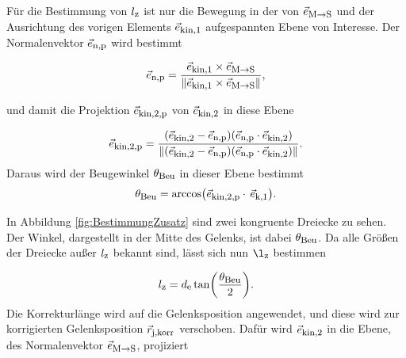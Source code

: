 Für die Bestimmung von $l_{\textrm{\footnotesize{z}}}$ ist nur die Bewegung in der von $\vec{e}_{\textrm{\footnotesize{M${\rightarrow}$S}}}$ und der Ausrichtung des vorigen Elements $\vec{e}_{\textrm{\footnotesize{kin,1}}}$ aufgespannten Ebene von Interesse. Der Normalenvektor $\vec{e}_{\textrm{\footnotesize{n,p}}}$ wird bestimmt

\begin{equation}
    \vec{e}_{\textrm{\footnotesize{n,p}}} = \frac{\vec{e}_{\textrm{\footnotesize{kin,1}}} \times \vec{e}_{\textrm{\footnotesize{M${\rightarrow}$S}}}}{\|\vec{e}_{\textrm{\footnotesize{kin,1}}} \times \vec{e}_{\textrm{\footnotesize{M${\rightarrow}$S}}}\|},
    \label{eq:korrProjection}
\end{equation}

und damit die Projektion $\vec{e}_{\textrm{\footnotesize{kin,2,p}}}$ von $\vec{e}_{\textrm{\footnotesize{kin,2}}}$ in diese Ebene

\begin{equation}
    \vec{e}_{\textrm{\footnotesize{kin,2,p}}} = \frac{ (\vec{e}_{\textrm{\footnotesize{kin,2}}} - \vec{e}_{\textrm{\footnotesize{n,p}}}) (\vec{e}_{\textrm{\footnotesize{n,p}}} \cdot \vec{e}_{\textrm{\footnotesize{kin,2}}})  }{\|(\vec{e}_{\textrm{\footnotesize{kin,2}}} - \vec{e}_{\textrm{\footnotesize{n,p}}}) (\vec{e}_{\textrm{\footnotesize{n,p}}} \cdot \vec{e}_{\textrm{\footnotesize{kin,2}}})\|}.
    \label{eq:korrVekProjetion}
\end{equation}
Daraus wird der Beugewinkel $\theta_{\textrm{\footnotesize{Beu}}}$ in dieser Ebene bestimmt
\begin{equation}
    \theta_{\textrm{\footnotesize{Beu}}} = \arccos\bigl(\vec{e}_{\textrm{\footnotesize{kin,2,p}}} \cdot\, \vec{e}_{\textrm{\footnotesize{k,1}}}\bigr).
\end{equation}

In Abbildung \ref{fig:BestimmungZusatz} sind zwei kongruente Dreiecke zu sehen. Der Winkel, dargestellt in der Mitte des Gelenks, ist dabei $\theta_{\textrm{\footnotesize{Beu}}}$. Da alle Größen der Dreiecke außer $l_{\textrm{\footnotesize{z}}}$ bekannt sind, lässt sich nun $\l\tindex{z}$ bestimmen

\begin{equation}
    l_{\textrm{\footnotesize{z}}} = d_{\textrm{\footnotesize{e}}} \tan\biggl({\frac{\theta_{\textrm{\footnotesize{Beu}}}}{2}}\biggr).
    \label{eq:Bestimmunglz}
\end{equation}
Die Korrekturlänge wird auf die Gelenksposition angewendet, und diese wird zur korrigierten Gelenksposition $\vec{r}_{\textrm{\footnotesize{j,korr}}}$ verschoben. Dafür wird $\vec{e}_{\textrm{\footnotesize{kin,2}}}$ in die Ebene, des Normalenvektor $\vec{e}_{\textrm{\footnotesize{M$\rightarrow$S}}}$, projiziert

